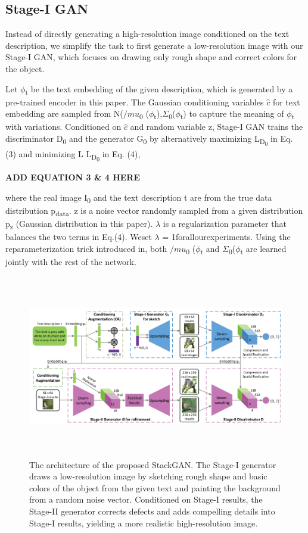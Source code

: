 \documentclass[a4paper,12pt,oneside]{article}
\begin{document}
\subsection{Stage-I GAN}

Instead of directly generating a high-resolution image conditioned on the text description, we simplify the task to first generate a low-resolution image with our Stage-I GAN, which focuses on drawing only rough shape and correct colors for the object. 

Let $\phi$\textsubscript{t} be the text embedding of the given description, which is generated by a pre-trained 
encoder in this paper. The Gaussian conditioning variables 
$\hat{c}$ 
for text embedding are sampled
from N($/mu$\textsubscript{0} ($\phi$\textsubscript{t}),$\Sigma$\textsubscript{0}($\phi$\textsubscript{t}) to 
capture the meaning of $\phi$\textsubscript{t} with variations. 
Conditioned on $\hat{c}$ and random variable z, Stage-I GAN trains the discriminator D\textsubscript{0} and the generator G\textsubscript{0} by alternatively maximizing L\textsubscript{D\textsubscript{0}}  in Eq. (3) and minimizing L L\textsubscript{D\textsubscript{0}} in Eq. (4), 

\textbf{ADD EQUATION 3 \& 4 HERE}

where the real image I\textsubscript{0} and the text description t are from the true data distribution p\textsubscript{data}. z is a noise vector randomly sampled from a given distribution p\textsubscript{z} (Gaussian distribution in this paper). $\lambda$ is a regularization parameter that balances the two terms in Eq.(4). Weset $\lambda$ = 1forallourexperiments. Using the reparameterization trick introduced in, both $/mu$\textsubscript{0} ($\phi$\textsubscript{t} and $\Sigma$\textsubscript{0}($\phi$\textsubscript{t} are learned jointly with the rest of the network.

\begin{figure}[H]
\centering
\includegraphics[height=8cm,width=15cm]{Figure2.png}
\caption[The architecture of the proposed StackGAN]{The architecture of the proposed StackGAN. The Stage-I generator draws a low-resolution image by sketching rough shape and basic colors of the object from the given text and painting the background from a random noise vector. Conditioned on Stage-I results, the Stage-II generator corrects defects and adds compelling details into Stage-I results, yielding a more realistic high-resolution image.}
\end{figure}
\end{document}
